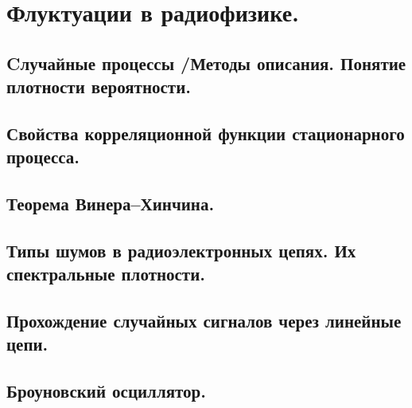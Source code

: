 \documentclass[../main/main.tex]{subfiles}
\begin{document}
\section{Флуктуации в радиофизике.}

\subsection{Cлучайные процессы /Методы описания. Понятие плотности вероятности.}

\subsection{Свойства корреляционной функции стационарного процесса.}

\subsection{Теорема Винера--Хинчина.}

\subsection{Типы шумов в радиоэлектронных цепях. Их спектральные плотности.}

\subsection{Прохождение случайных сигналов через линейные цепи.}

\subsection{Броуновский осциллятор.}
\end{document}
